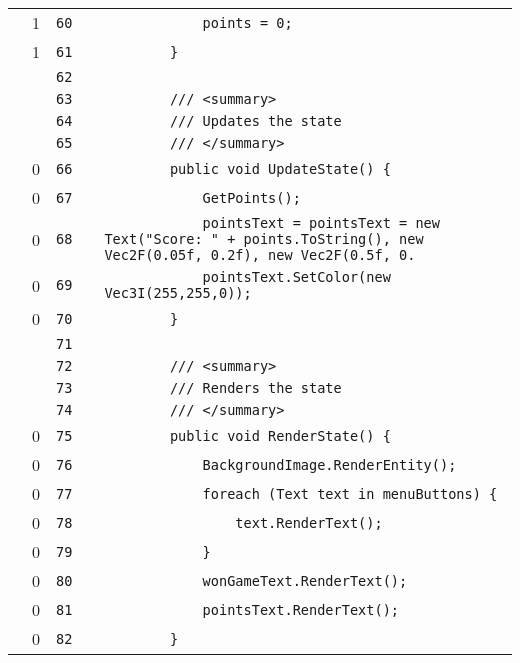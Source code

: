 \documentclass[a4paper,landscape,10pt]{article}
\begin{document}
\begin{longtable}[l]{lrrll}
\cellcolor{green} & 1 & \verb~60~ & & \verb~            points = 0;~\\
\cellcolor{green} & 1 & \verb~61~ & & \verb~        }~\\
\cellcolor{gray} &  & \verb~62~ & & \verb~~\\
\cellcolor{gray} &  & \verb~63~ & & \verb~        /// <summary>~\\
\cellcolor{gray} &  & \verb~64~ & & \verb~        /// Updates the state~\\
\cellcolor{gray} &  & \verb~65~ & & \verb~        /// </summary>~\\
\cellcolor{red} & 0 & \verb~66~ & & \verb~        public void UpdateState() {~\\
\cellcolor{red} & 0 & \verb~67~ & & \verb~            GetPoints();~\\
\cellcolor{red} & 0 & \verb~68~ & & \verb~            pointsText = pointsText = new Text("Score: " + points.ToString(), new Vec2F(0.05f, 0.2f), new Vec2F(0.5f, 0.~\\
\cellcolor{red} & 0 & \verb~69~ & & \verb~            pointsText.SetColor(new Vec3I(255,255,0));~\\
\cellcolor{red} & 0 & \verb~70~ & & \verb~        }~\\
\cellcolor{gray} &  & \verb~71~ & & \verb~~\\
\cellcolor{gray} &  & \verb~72~ & & \verb~        /// <summary>~\\
\cellcolor{gray} &  & \verb~73~ & & \verb~        /// Renders the state~\\
\cellcolor{gray} &  & \verb~74~ & & \verb~        /// </summary>~\\
\cellcolor{red} & 0 & \verb~75~ & & \verb~        public void RenderState() {~\\
\cellcolor{red} & 0 & \verb~76~ & & \verb~            BackgroundImage.RenderEntity();~\\
\cellcolor{red} & 0 & \verb~77~ & & \verb~            foreach (Text text in menuButtons) {~\\
\cellcolor{red} & 0 & \verb~78~ & & \verb~                text.RenderText();~\\
\cellcolor{red} & 0 & \verb~79~ & & \verb~            }~\\
\cellcolor{red} & 0 & \verb~80~ & & \verb~            wonGameText.RenderText();~\\
\cellcolor{red} & 0 & \verb~81~ & & \verb~            pointsText.RenderText();~\\
\cellcolor{red} & 0 & \verb~82~ & & \verb~        }~\\

\end{longtable}
\end{document}
